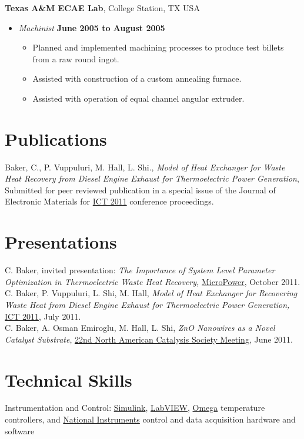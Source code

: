 \documentclass[line,margin]{res}
\begin{document}
\begin{resume}
\textbf{Texas A\&M ECAE Lab}, College Station, TX USA
\begin{itemize}
\item \textit{Machinist}%
  \hfill \textbf{June 2005 to August 2005}
  \begin{itemize}
  \item Planned and implemented machining processes to produce test
    billets from a raw round ingot.
  \item Assisted with construction of a custom annealing furnace.
  \item Assisted with operation of equal channel angular extruder.
  \end{itemize}
\end{itemize}

\section{Publications}

Baker, C., P. Vuppuluri, M. Hall, L. Shi., \textit{Model of Heat
  Exchanger for Waste Heat Recovery from Diesel Engine Exhaust for
  Thermoelectric Power Generation}, Submitted for peer reviewed
publication in a special issue of the Journal of Electronic Materials
for \href{http://ict2011.its.org/}{ICT 2011} conference proceedings.

\section{Presentations}
C. Baker, invited presentation: \textit{The Importance of System Level
Parameter Optimization in Thermoelectric Waste Heat Recovery,}
\href{http://www.micropower-global.com/our_company/texasstate/}{MicroPower},
October 2011. \\
C. Baker, P. Vuppuluri, L. Shi, M. Hall, \textit{Model of Heat Exchanger for
Recovering Waste Heat from Diesel Engine Exhaust for Thermoelectric
Power Generation,}
\href{http://ict2011.its.org/}{ICT 2011}, July 2011. \\
C. Baker, A. Osman Emiroglu, M. Hall, L. Shi, \textit{ZnO Nanowires as a
Novel Catalyst Substrate}, \href{http://www.22nam.org/}{22nd North
  American Catalysis Society Meeting}, June 2011.

\section{Technical Skills}
% 
Instrumentation and Control:
\href{http://www.mathworks.com/products/simulink/}{Simulink},
\href{http://www.ni.com/}{LabVIEW}, 
\href{http://www.omega.com/}{Omega} temperature controllers,
and
\href{http://www.ni.com}{National Instruments}
control and data acquisition hardware and software


\end{resume}
\end{document}
